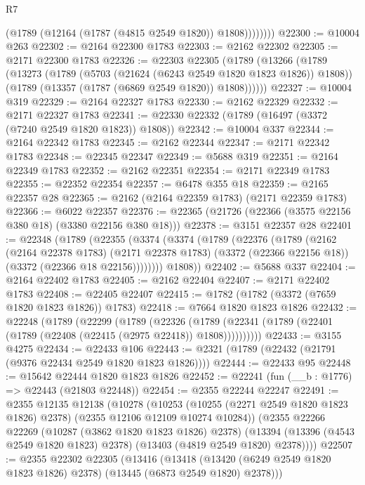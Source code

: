 \begin{lexlean}{R7}
\begin{coremodule}
                (@1789 (@12164 (@1787 (@4815 @2549 @1820)) @1808))))))))
@22300 := @10004 @263
@22302 := @2164 @22300 @1783
@22303 := @2162 @22302
@22305 := @2171 @22300 @1783
@22326 := @22303
    @22305
    (@1789
      (@13266
        (@1789
          (@13273
            (@1789 (@5703 (@21624 (@6243 @2549 @1820 @1823 @1826)) @1808))
            (@1789 (@13357 (@1787 (@6869 @2549 @1820)) @1808))))))
@22327 := @10004 @319
@22329 := @2164 @22327 @1783
@22330 := @2162 @22329
@22332 := @2171 @22327 @1783
@22341 := @22330 @22332 (@1789 (@16497 (@3372 (@7240 @2549 @1820 @1823)) @1808))
@22342 := @10004 @337
@22344 := @2164 @22342 @1783
@22345 := @2162 @22344
@22347 := @2171 @22342 @1783
@22348 := @22345 @22347
@22349 := @5688 @319
@22351 := @2164 @22349 @1783
@22352 := @2162 @22351
@22354 := @2171 @22349 @1783
@22355 := @22352 @22354
@22357 := @6478 @355 @18
@22359 := @2165 @22357 @28
@22365 := @2162 (@2164 @22359 @1783) (@2171 @22359 @1783)
@22366 := @6022 @22357
@22376 := @22365 (@21726 (@22366 (@3575 @22156 @380 @18) (@3380 @22156 @380 @18)))
@22378 := @3151 @22357 @28
@22401 := @22348
    (@1789
      (@22355
        (@3374
          (@3374
            (@1789
              (@22376
                (@1789
                  (@2162
                    (@2164 @22378 @1783)
                    (@2171 @22378 @1783)
                    (@3372 (@22366 @22156 @18))
                    (@3372 (@22366 @18 @22156))))))))
        @1808))
@22402 := @5688 @337
@22404 := @2164 @22402 @1783
@22405 := @2162 @22404
@22407 := @2171 @22402 @1783
@22408 := @22405 @22407
@22415 := @1782 (@1782 (@3372 (@7659 @1820 @1823 @1826)) @1783)
@22418 := @7664 @1820 @1823 @1826
@22432 := @22248
    (@1789
      (@22299
        (@1789
          (@22326
            (@1789 (@22341 (@1789 (@22401 (@1789 (@22408 (@22415 (@2975 @22418)) @1808))))))))))
@22433 := @3155 @4275
@22434 := @22433 @106
@22443 := @2321 (@1789 (@22432 (@21791 (@9376 @22434 @2549 @1820 @1823 @1826))))
@22444 := @22433 @95
@22448 := @15642 @22444 @1820 @1823 @1826
@22452 := @22241 (fun (__b : @1776) => @22443 (@21803 @22448))
@22454 := @2355 @22244 @22247
@22491 := @2355
    @12135
    @12138
    (@10278
      (@10253 (@10255 (@2271 @2549 @1820 @1823 @1826) @2378) (@2355 @12106 @12109 @10274 @10284))
      (@2355
        @22266
        @22269
        (@10287 (@3862 @1820 @1823 @1826) @2378)
        (@13394 (@13396 (@4543 @2549 @1820 @1823) @2378) (@13403 (@4819 @2549 @1820) @2378))))
@22507 := @2355
    @22302
    @22305
    (@13416
      (@13418 (@13420 (@6249 @2549 @1820 @1823 @1826) @2378) (@13445 (@6873 @2549 @1820) @2378)))

\end{coremodule}
\end{lexlean}
